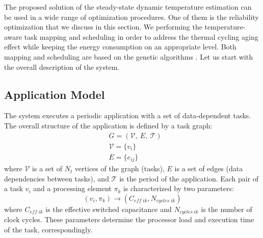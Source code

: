 The proposed solution of the steady-state dynamic temperature estimation can be used in a wide range of optimization procedures. One of them is the reliability optimization that we discuss in this section. We performing the temperature-aware task mapping and scheduling in order to address the thermal cycling aging effect while keeping the energy consumption on an appropriate level. Both mapping and scheduling are based on the genetic algorithms \cite{schmitz2004}. Let us start with the overall description of the system.

\subsection{Application Model}
The system executes a periodic application with a set of data-dependent tasks. The overall structure of the application is defined by a task graph:
\begin{align*}
  & G = (\mathcal{V}, \: E, \: \mathcal{T}) \\
  & \mathcal{V} = \{ v_i \} \\
  & E = \{ e_{ij} \}
\end{align*}
where $\mathcal{V}$ is a set of $N_t$ vertices of the graph (tasks), $E$ is a set of edges (data dependencies between tasks), and $\mathcal{T}$ is the period of the application. Each pair of a task $v_i$ and a processing element $\pi_k$ is characterized by two parameters:
\begin{equation*}
  (v_i, \pi_k) \rightarrow (C_{eff \; ik}, N_{cycles \; ik})
\end{equation*}
where $C_{eff \; ik}$ is the effective switched capacitance and $N_{cycles \: ik}$ is the number of clock cycles. These parameters determine the processor load and execution time of the task, correspondingly.

